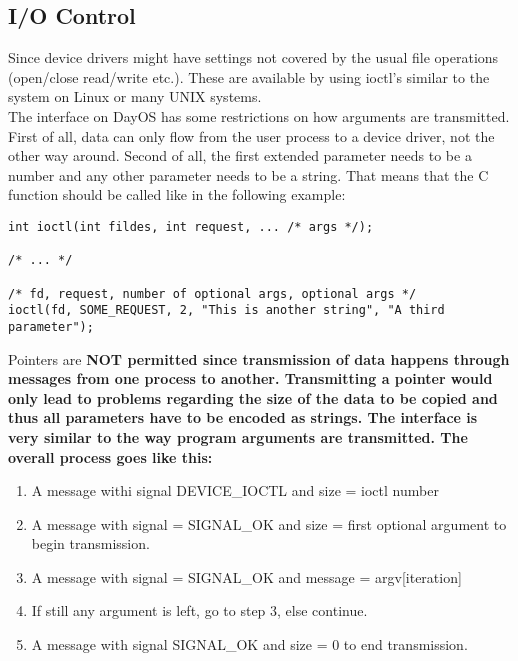\subsection{I/O Control}
Since device drivers might have settings not covered by the usual file operations (open/close read/write etc.).
These are available by using ioctl's similar to the system on Linux or many UNIX systems. \\
The interface on DayOS has some restrictions on how arguments are transmitted.
First of all, data can only flow from the user process to a device driver, not the other way around.
Second of all, the first extended parameter needs to be a number
and any other parameter needs to be a string. That means that the C function should be called
like in the following example:
\begin{verbatim}
int ioctl(int fildes, int request, ... /* args */);

/* ... */

/* fd, request, number of optional args, optional args */
ioctl(fd, SOME_REQUEST, 2, "This is another string", "A third parameter");
\end{verbatim}
Pointers are \bf{NOT} permitted since transmission of data happens through messages
from one process to another. Transmitting a pointer would only lead to problems regarding
the size of the data to be copied and thus all parameters have to be encoded as strings.
The interface is very similar to the way program arguments are transmitted.
The overall process goes like this:
\begin{enumerate}
 \item A message withi signal DEVICE\_IOCTL and size = ioctl number
 \item A message with signal = SIGNAL\_OK and size = first optional argument to begin transmission.
 \item A message with signal = SIGNAL\_OK and message = argv[iteration]
 \item If still any argument is left, go to step 3, else continue.
 \item A message with signal SIGNAL\_OK and size = 0 to end transmission.
\end{enumerate}